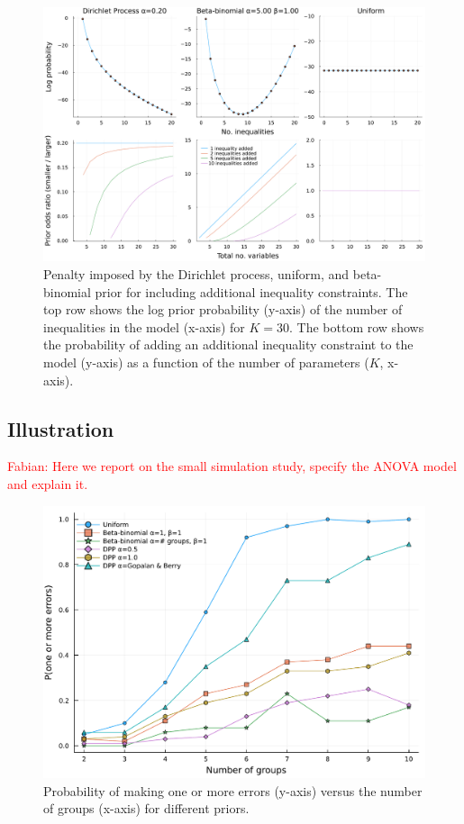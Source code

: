 \documentclass[11pt,a4paper]{article}
\theoremstyle{definition} %
\theoremstyle{case}
\newcommand{\FD}[1]{\textcolor{red}{Fabian: #1 }}
\begin{document}
\begin{figure}
    \centering
    \includegraphics[width=\textwidth]{figures/prior_comparison_plot_2x4_without_log_without_betabinomial.pdf}
    \caption{Penalty imposed by the Dirichlet process, uniform, and beta-binomial prior for including additional inequality constraints. The top row shows the log prior probability (y-axis) of the number of inequalities in the model (x-axis) for $K = 30$. The bottom row shows the probability of adding an additional inequality constraint to the model (y-axis) as a function of the number of parameters ($K$, x-axis).}
    \label{fig:scott_berger}
\end{figure}

\subsection{Illustration} \label{sec:illustration}
\FD{Here we report on the small simulation study, specify the ANOVA model and explain it.}

\begin{figure}
    \centering
    \includegraphics[width=\textwidth]{figures/one_or_more_errors2.pdf}
    \caption{Probability of making one or more errors (y-axis) versus the number of groups (x-axis) for different priors.}
    \label{fig:small_simulation}
\end{figure}
\end{document}
